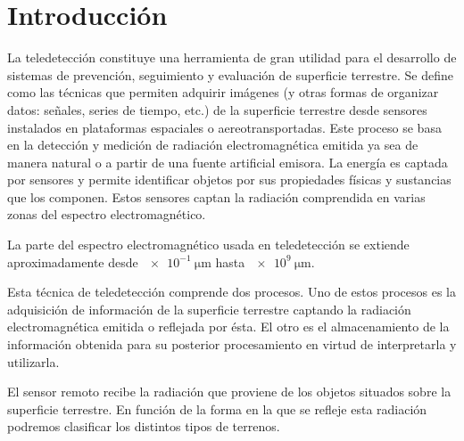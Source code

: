 
\chapter{Introducción}

La teledetección constituye una herramienta de gran utilidad para el desarrollo de sistemas de prevención, seguimiento y evaluación de superficie terrestre. Se define como  las técnicas que permiten adquirir imágenes (y otras formas de organizar datos: señales, series de tiempo, etc.) de la  superficie terrestre desde sensores instalados en plataformas espaciales o aereotransportadas. 
Este proceso se basa en la detección y medición de radiación electromagnética emitida ya sea de manera natural o a partir de una fuente artificial emisora.
La energía es captada por sensores y permite identificar objetos por sus propiedades físicas y sustancias que los componen. 
Estos sensores captan la radiación comprendida en varias zonas del espectro electromagnético. 

La parte del espectro electromagnético usada en teledetección se extiende aproximadamente desde $\SI{e-1}{\micro\meter}$ hasta $\SI{e9}{\micro\meter}$.

Esta técnica de teledetección comprende dos procesos. 
Uno de estos procesos es la adquisición de información de la superficie terrestre captando la radiación electromagnética emitida o reflejada por ésta. 
El otro es el almacenamiento de la información obtenida para su posterior procesamiento en virtud de interpretarla y utilizarla. 

El sensor remoto recibe la radiación que proviene de los objetos situados sobre la superficie terrestre. 
En función de la forma en la que se refleje esta radiación podremos clasificar los distintos tipos de terrenos.


